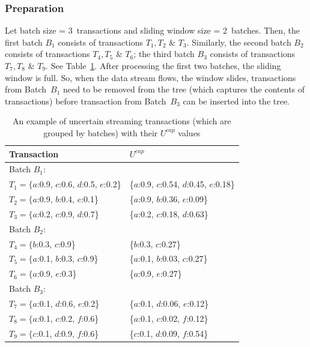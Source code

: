 \documentclass[10pt, conference, compsocconf]{IEEEtran}
\begin{document}
\subsubsection{Preparation}\label{sec:prep}

%
Let batch size = 3~transactions and sliding window size = 2~batches. Then, the first batch $B_1$ consists of transactions $T_1, T_2$ \& $T_3$. Similarly, the second batch $B_2$ consists of transactions $T_4, T_5$ \& $T_6$; the third batch $B_3$ consists of transactions $T_7, T_8$ \& $T_9$. See Table~\ref{table:prefix_assigned}.
After processing the first two batches, the sliding window is full. So, when the data stream flows, the window slides, transactions from Batch~$B_1$ need to be removed from the tree (which captures the contents of transactions) before transaction from Batch~$B_3$ can be inserted into the tree.

\begin{table}[t]
\centering
\caption{An example of uncertain streaming transactions (which are grouped by batches) with their $U^{cap}$ values}
\label{table:prefix_assigned}
\vspace*{-3mm}
\begin{tabular}{ll}
\hline
Transaction & $U^{cap}$\\ \hline
\multicolumn{2}{l}{Batch $B_1$:}\\
	$T_1 = \{a$:0.9, $c$:0.6, $d$:0.5, $e$:0.2\} & \{$a$:0.9, $c$:0.54, $d$:0.45, $e$:0.18\}\\
	$T_2 = \{a$:0.9, $b$:0.4, $e$:0.1\} & \{$a$:0.9, $b$:0.36, $e$:0.09\}\\
	$T_3 = \{a$:0.2, $c$:0.9, $d$:0.7\} & \{$a$:0.2, $c$:0.18, $d$:0.63\}\\
\hline
\multicolumn{2}{l}{Batch $B_2$:}\\
	$T_4 = \{b$:0.3, $c$:0.9\} & \{$b$:0.3, $c$:0.27\}\\
	$T_5 = \{a$:0.1, $b$:0.3, $c$:0.9\} & \{$a$:0.1, $b$:0.03, $c$:0.27\}\\
	$T_6 = \{a$:0.9, $e$:0.3\} & \{$a$:0.9, $e$:0.27\}\\
\hline
\multicolumn{2}{l}{Batch $B_3$:}\\
	$T_7 = \{a$:0.1, $d$:0.6, $e$:0.2\} & \{$a$:0.1, $d$:0.06, $e$:0.12\}\\
	$T_8 = \{a$:0.1, $c$:0.2, $f$:0.6\} & \{$a$:0.1, $c$:0.02, $f$:0.12\}\\
	$T_9 = \{c$:0.1, $d$:0.9, $f$:0.6\} & \{$c$:0.1, $d$:0.09, $f$:0.54\}\\
\hline
	\end{tabular}
\end{table}
\end{document}
